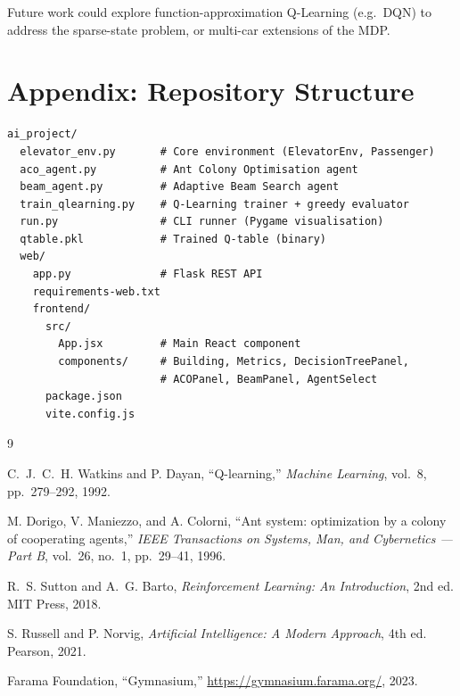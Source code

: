 \documentclass[12pt,a4paper]{article}
\begin{document}
Future work could explore function-approximation Q-Learning (e.g.\ DQN) to address
the sparse-state problem, or multi-car extensions of the MDP.

\section*{Appendix: Repository Structure}

\begin{lstlisting}
ai_project/
  elevator_env.py       # Core environment (ElevatorEnv, Passenger)
  aco_agent.py          # Ant Colony Optimisation agent
  beam_agent.py         # Adaptive Beam Search agent
  train_qlearning.py    # Q-Learning trainer + greedy evaluator
  run.py                # CLI runner (Pygame visualisation)
  qtable.pkl            # Trained Q-table (binary)
  web/
    app.py              # Flask REST API
    requirements-web.txt
    frontend/
      src/
        App.jsx         # Main React component
        components/     # Building, Metrics, DecisionTreePanel,
                        # ACOPanel, BeamPanel, AgentSelect
      package.json
      vite.config.js
\end{lstlisting}

\begin{thebibliography}{9}

C.~J.~C.~H. Watkins and P. Dayan,
``Q-learning,''
\textit{Machine Learning}, vol.~8, pp.~279--292, 1992.

M. Dorigo, V. Maniezzo, and A. Colorni,
``Ant system: optimization by a colony of cooperating agents,''
\textit{IEEE Transactions on Systems, Man, and Cybernetics --- Part B},
vol.~26, no.~1, pp.~29--41, 1996.

R.~S. Sutton and A.~G. Barto,
\textit{Reinforcement Learning: An Introduction}, 2nd ed.
MIT Press, 2018.

S. Russell and P. Norvig,
\textit{Artificial Intelligence: A Modern Approach}, 4th ed.
Pearson, 2021.

Farama Foundation,
``Gymnasium,''
\url{https://gymnasium.farama.org/}, 2023.

\end{thebibliography}
\end{document}

